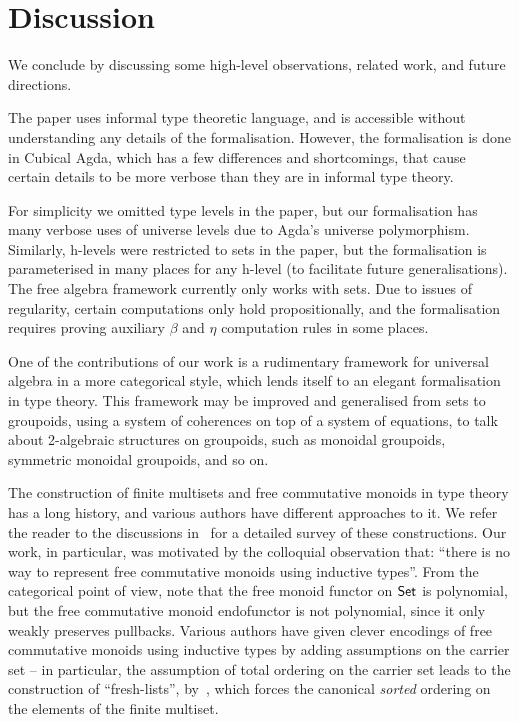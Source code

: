 
\section{Discussion}
\label{sec:discussion}

We conclude by discussing some high-level observations, related work, and future directions.

%
The paper uses informal type theoretic language,
and is accessible without understanding any details of the formalisation.
However, the formalisation is done in Cubical Agda, which has a few differences and
shortcomings, that cause certain details to be more verbose than they are in informal type theory.

For simplicity we omitted type levels in the paper,
but our formalisation has many verbose uses of universe levels due to Agda's universe polymorphism.
Similarly, h-levels were restricted to sets in the paper, but the formalisation is parameterised in many places for any
h-level (to facilitate future generalisations).
The free algebra framework currently only works with sets.
Due to issues of regularity, certain computations only hold propositionally,
and the formalisation requires proving auxiliary $\beta$ and $\eta$ computation rules in some places.

%
One of the contributions of our work is a rudimentary framework for universal algebra in a more
categorical style, which lends itself to an elegant formalisation in type theory.
%
This framework may be improved and generalised from sets to groupoids,
using a system of coherences on top of a system of equations,
to talk about 2-algebraic structures on groupoids,
such as monoidal groupoids, symmetric monoidal groupoids, and so on.
%

%
The construction of finite multisets and free commutative monoids in type theory has a long history,
and various authors have different approaches to it. We refer the reader to the discussions
in~\cite{choudhuryFreeCommutativeMonoids2023,joramConstructiveFinalSemantics2023} for a detailed survey of these
constructions.
%
Our work, in particular, was motivated by the colloquial observation that:
``there is no way to represent free commutative monoids using inductive types''.
%
From the categorical point of view, note that the free monoid functor on $\mathsf{Set}$ is polynomial,
but the free commutative monoid endofunctor is not polynomial, since it only weakly preserves pullbacks.
%
Various authors have given clever encodings of free commutative monoids using inductive types by adding
assumptions on the carrier set -- in particular, the assumption of total ordering on the carrier set leads to the
construction of ``fresh-lists'', by~\cite{kupkeFreshLookCommutativity2023}, which forces the canonical \emph{sorted}
ordering on the elements of the finite multiset.

